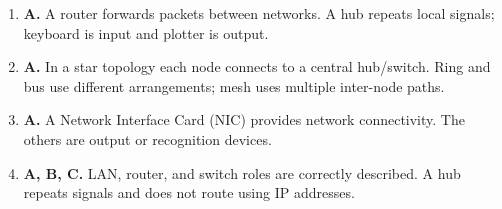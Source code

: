 \begin{enumerate}[label=\textbf{Q\arabic*.}, leftmargin=*]
\item \textbf{A.} A router forwards packets between networks. A hub repeats local signals; keyboard is input and plotter is output.

\item \textbf{A.} In a star topology each node connects to a central hub/switch. Ring and bus use different arrangements; mesh uses multiple inter-node paths.

\item \textbf{A.} A Network Interface Card (NIC) provides network connectivity. The others are output or recognition devices.

\item \textbf{A, B, C.} LAN, router, and switch roles are correctly described. A hub repeats signals and does not route using IP addresses.

\end{enumerate}
